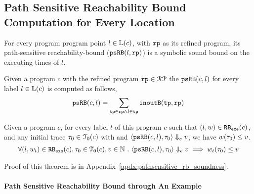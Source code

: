 \subsection{Path Sensitive Reachability Bound Computation for Every Location}
\label{sec:pathsensitive_rb-psrbcompute}
For every program program point $l \in \mathbb{L}(c)$, with $\mathtt{rp}$ as its refined program,
its path-sensitive reachability-bound ($\mathtt{psRB}(l, \mathtt{rp})$) is a symbolic sound bound on the executing times of $l$.
%
 \begin{defn}
  \label{def:label_psrb}
Given a program $c$ with the refined program $\mathtt{rp} \in \mathcal{RP}$
the $\mathtt{psRB}(c, l)$ for every label $l \in \mathbb{L}(c)$ is computed as follows,
\[ 
  \mathtt{psRB}(c, l) = \sum\limits_{\mathtt{tp} \in \mathtt{rp} \land 
l \in \mathtt{tp}} \mathtt{inoutB}(\mathtt{tp}, \mathtt{rp})
\]
 \end{defn}
\begin{thm}
  \label{thm:pathsensitive_rb_soundness}
Given a program ${c}$, for every label $l$ of this program $c$ such that $(l, w) \in \mathtt{RB_{exe}}(c)$, 
and any initial trace $\mathtt{\tau}_0 \in \mathcal{T}_0(c)$ with 
and $\langle \mathtt{psRB}(c, l), \mathtt{\tau}_0 \rangle \Downarrow_e v$,
we have $ w(\mathtt{\tau}_0) \leq v $.
%
\[
  \begin{array}{l}
  \forall (l, w_{t}) \in \mathtt{RB_{exe}}(c),
  \mathtt{\tau}_0 \in \mathcal{T}_0(c), 
  v \in \mathbb{N} ~.~
  \langle \mathtt{psRB}(c, l), \mathtt{\tau}_0 \rangle \Downarrow_e v
  \implies
  w_{t}(\mathtt{\tau}_0) \leq v
  \end{array}
\]
\end{thm}
%
Proof of this theorem is in Appendix~\ref{apdx:pathsensitive_rb_soundness}.
\paragraph*{Path Sensitive Reachability Bound through An Example}
